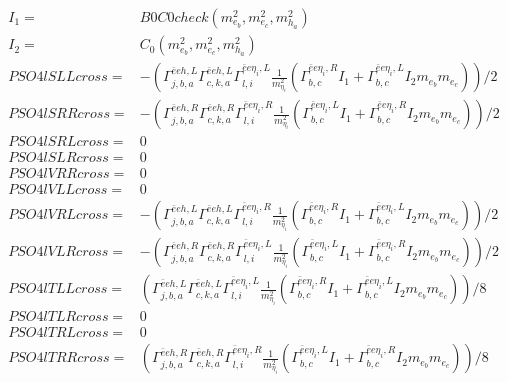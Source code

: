 \documentclass[A4,landscape]{article}
\begin{document}
\begin{align} 
I_1= & B0C0check(m^2_{e_{{b}}}, m^2_{e_{{c}}}, m^2_{h_{{a}}}) \\ 
I_2= & C_0(m^2_{e_{{b}}}, m^2_{e_{{c}}}, m^2_{h_{{a}}}) \\ 
  PSO4lSLLcross= & -( \Gamma^{\bar{e}e h ,L}_{j, b, a} \Gamma^{\bar{e}e h ,L}_{c, k, a} \Gamma^{\bar{e}e \eta_i ,L}_{l, i} \frac{1}{m^2_{\eta_i}} (\Gamma^{\bar{e}e \eta_i ,R}_{b, c} I_1 + \Gamma^{\bar{e}e \eta_i ,L}_{b, c} I_2 m_{e_{{b}}} m_{e_{{c}}}))/2 \\ 
  PSO4lSRRcross= & -( \Gamma^{\bar{e}e h ,R}_{j, b, a} \Gamma^{\bar{e}e h ,R}_{c, k, a} \Gamma^{\bar{e}e \eta_i ,R}_{l, i} \frac{1}{m^2_{\eta_i}} (\Gamma^{\bar{e}e \eta_i ,L}_{b, c} I_1 + \Gamma^{\bar{e}e \eta_i ,R}_{b, c} I_2 m_{e_{{b}}} m_{e_{{c}}}))/2 \\ 
  PSO4lSRLcross= & 0 \\ 
  PSO4lSLRcross= & 0 \\ 
  PSO4lVRRcross= & 0 \\ 
  PSO4lVLLcross= & 0 \\ 
  PSO4lVRLcross= & -( \Gamma^{\bar{e}e h ,L}_{j, b, a} \Gamma^{\bar{e}e h ,L}_{c, k, a} \Gamma^{\bar{e}e \eta_i ,R}_{l, i} \frac{1}{m^2_{\eta_i}} (\Gamma^{\bar{e}e \eta_i ,R}_{b, c} I_1 + \Gamma^{\bar{e}e \eta_i ,L}_{b, c} I_2 m_{e_{{b}}} m_{e_{{c}}}))/2 \\ 
  PSO4lVLRcross= & -( \Gamma^{\bar{e}e h ,R}_{j, b, a} \Gamma^{\bar{e}e h ,R}_{c, k, a} \Gamma^{\bar{e}e \eta_i ,L}_{l, i} \frac{1}{m^2_{\eta_i}} (\Gamma^{\bar{e}e \eta_i ,L}_{b, c} I_1 + \Gamma^{\bar{e}e \eta_i ,R}_{b, c} I_2 m_{e_{{b}}} m_{e_{{c}}}))/2 \\ 
  PSO4lTLLcross= & ( \Gamma^{\bar{e}e h ,L}_{j, b, a} \Gamma^{\bar{e}e h ,L}_{c, k, a} \Gamma^{\bar{e}e \eta_i ,L}_{l, i} \frac{1}{m^2_{\eta_i}} (\Gamma^{\bar{e}e \eta_i ,R}_{b, c} I_1 + \Gamma^{\bar{e}e \eta_i ,L}_{b, c} I_2 m_{e_{{b}}} m_{e_{{c}}}))/8 \\ 
  PSO4lTLRcross= & 0 \\ 
  PSO4lTRLcross= & 0 \\ 
  PSO4lTRRcross= & ( \Gamma^{\bar{e}e h ,R}_{j, b, a} \Gamma^{\bar{e}e h ,R}_{c, k, a} \Gamma^{\bar{e}e \eta_i ,R}_{l, i} \frac{1}{m^2_{\eta_i}} (\Gamma^{\bar{e}e \eta_i ,L}_{b, c} I_1 + \Gamma^{\bar{e}e \eta_i ,R}_{b, c} I_2 m_{e_{{b}}} m_{e_{{c}}}))/8 \\ 
\end{align} 
\end{document}
